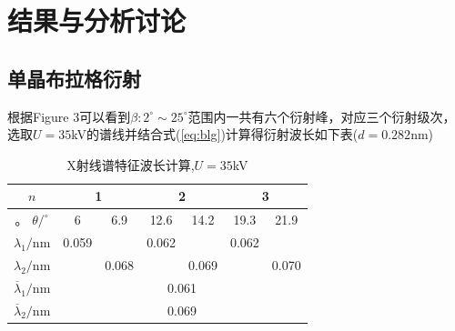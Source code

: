 \documentclass[10.5pt]{article}
\renewcommand{\=}[1]{\stackrel{#1}{=}} %
\theoremstyle{definition}
\theoremstyle{remark}
\begin{document}
	\section{结果与分析讨论}
	\subsection{单晶布拉格衍射}
	根据Figure 3可以看到$\beta:2^\circ\sim25^\circ$范围内一共有六个衍射峰，对应三个衍射级次，选取$U=35 $kV的谱线并结合式(\ref{eq:blg})计算得衍射波长如下表($d=0.282 $nm)
	\begin{table}[htbp]
		\centering
		\caption{X射线谱特征波长计算,$U=35 $kV}
		\begin{tabular}{|c|c|c|c|c|c|c|}
			\hline
			$n$     & \multicolumn{2}{c|}{1} & \multicolumn{2}{c|}{2} & \multicolumn{2}{c|}{3} \bigstrut\\
			\hline。
			$\theta/^\circ$ & 6     & 6.9   & 12.6  & 14.2  & 19.3  & 21.9 \bigstrut\\
			\hline
			$\lambda_1/$nm & 0.059  &       & 0.062  &       & 0.062  &  \bigstrut\\
			\hline
			$\lambda_2/$nm &       & 0.068  &       & 0.069  &       & 0.070  \bigstrut\\
			\hline
			$\overline{\lambda}_1/$nm& \multicolumn{6}{c|}{0.061 } \bigstrut\\
			\hline
			$\overline{\lambda}_2/$nm& \multicolumn{6}{c|}{0.069 } \bigstrut\\
			\hline
		\end{tabular}%
	\end{table}%
	
\end{document}
